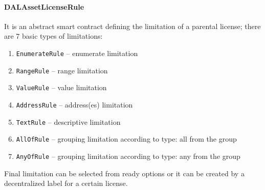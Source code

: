 \documentclass[12pt]{report}
\def\code#1{\colorbox{light-gray}{\texttt{#1}}}
\begin{document}
\paragraph{DALAssetLicenseRule}\hfill\null\linebreak
It is an abstract smart contract defining the limitation of a parental license; there are 7 basic types of limitations:
\begin{enumerate}
	\item \code{EnumerateRule} – enumerate limitation
	\item \code{RangeRule} – range limitation
	\item \code{ValueRule} – value limitation
	\item \code{AddressRule} – address(es) limitation
	\item \code{TextRule} – descriptive limitation
	\item \code{AllOfRule} – grouping limitation according to type: all from the group
	\item \code{AnyOfRule} – grouping limitation according to type: any from the group
\end{enumerate}

Final limitation can be selected from ready options or it can be created by a decentralized label for a certain license.
\end{document}
